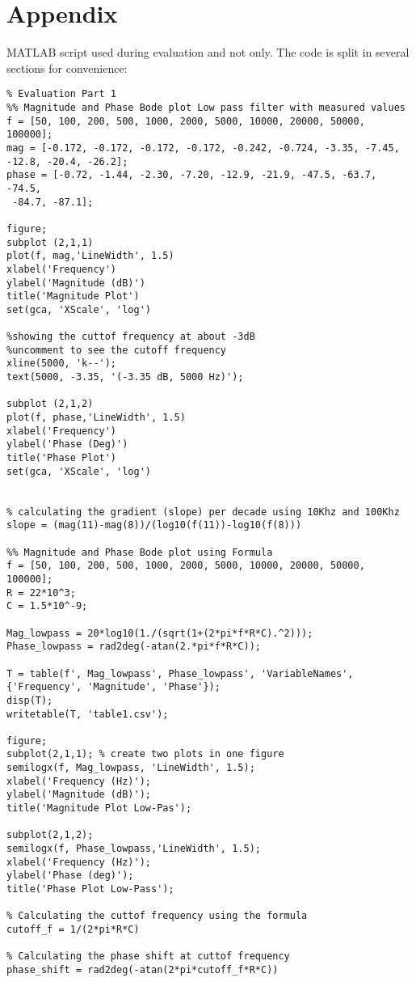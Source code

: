 \documentclass[12pt]{report}
\begin{document}
\chapter{Appendix}
MATLAB script used during evaluation and not only. The code is split in several sections for convenience:
\begin{verbatim}
% Evaluation Part 1
%% Magnitude and Phase Bode plot Low pass filter with measured values
f = [50, 100, 200, 500, 1000, 2000, 5000, 10000, 20000, 50000, 100000];
mag = [-0.172, -0.172, -0.172, -0.172, -0.242, -0.724, -3.35, -7.45, 
-12.8, -20.4, -26.2];
phase = [-0.72, -1.44, -2.30, -7.20, -12.9, -21.9, -47.5, -63.7, -74.5,
 -84.7, -87.1];

figure;
subplot (2,1,1)
plot(f, mag,'LineWidth', 1.5)
xlabel('Frequency')
ylabel('Magnitude (dB)')
title('Magnitude Plot')
set(gca, 'XScale', 'log')

%showing the cuttof frequency at about -3dB
%uncomment to see the cutoff frequency
xline(5000, 'k--');
text(5000, -3.35, '(-3.35 dB, 5000 Hz)');

subplot (2,1,2)
plot(f, phase,'LineWidth', 1.5)
xlabel('Frequency') 
ylabel('Phase (Deg)')
title('Phase Plot')
set(gca, 'XScale', 'log')  


% calculating the gradient (slope) per decade using 10Khz and 100Khz
slope = (mag(11)-mag(8))/(log10(f(11))-log10(f(8)))

%% Magnitude and Phase Bode plot using Formula 
f = [50, 100, 200, 500, 1000, 2000, 5000, 10000, 20000, 50000, 100000];
R = 22*10^3;
C = 1.5*10^-9;

Mag_lowpass = 20*log10(1./(sqrt(1+(2*pi*f*R*C).^2)));
Phase_lowpass = rad2deg(-atan(2.*pi*f*R*C));

T = table(f', Mag_lowpass', Phase_lowpass', 'VariableNames', 
{'Frequency', 'Magnitude', 'Phase'});
disp(T);
writetable(T, 'table1.csv');

figure;
subplot(2,1,1); % create two plots in one figure
semilogx(f, Mag_lowpass, 'LineWidth', 1.5);
xlabel('Frequency (Hz)');
ylabel('Magnitude (dB)');
title('Magnitude Plot Low-Pas');

subplot(2,1,2);
semilogx(f, Phase_lowpass,'LineWidth', 1.5);
xlabel('Frequency (Hz)');
ylabel('Phase (deg)');
title('Phase Plot Low-Pass');

% Calculating the cuttof frequency using the formula
cutoff_f = 1/(2*pi*R*C)

% Calculating the phase shift at cuttof frequency
phase_shift = rad2deg(-atan(2*pi*cutoff_f*R*C))


\end{verbatim}
\end{document}
